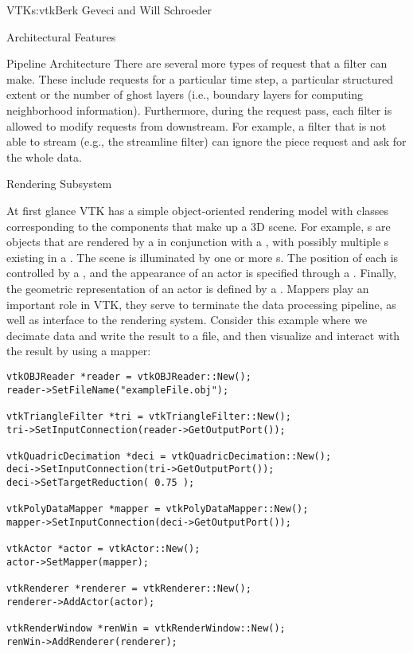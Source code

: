 \begin{aosachapter}{VTK}{s:vtk}{Berk Geveci and Will Schroeder}
\begin{aosasect1}{Architectural Features}
\begin{aosasect2}{Pipeline Architecture}
There are several more types of request that a filter can make. These
include requests for a particular time step, a particular structured
extent or the number of ghost layers (i.e., boundary layers for
computing neighborhood information). Furthermore, during the request
pass, each filter is allowed to modify requests from downstream. For
example, a filter that is not able to stream (e.g., the streamline
filter) can ignore the piece request and ask for the whole data.

\end{aosasect2}

\begin{aosasect2}{Rendering Subsystem}

At first glance VTK has a simple object-oriented rendering model with
classes corresponding to the components that make up a 3D scene. For
example, s are objects that are rendered by a
 in conjunction with a , with
possibly multiple s existing in a
. The scene is illuminated by one or more
s. The position of each  is controlled
by a , and the appearance of an actor is specified
through a . Finally, the geometric representation of
an actor is defined by a . Mappers play an important
role in VTK, they serve to terminate the data processing pipeline, as
well as interface to the rendering system. Consider this example where
we decimate data and write the result to a file, and then visualize
and interact with the result by using a mapper:

\begin{verbatim}
vtkOBJReader *reader = vtkOBJReader::New();
reader->SetFileName("exampleFile.obj");

vtkTriangleFilter *tri = vtkTriangleFilter::New();
tri->SetInputConnection(reader->GetOutputPort());

vtkQuadricDecimation *deci = vtkQuadricDecimation::New();
deci->SetInputConnection(tri->GetOutputPort());
deci->SetTargetReduction( 0.75 );

vtkPolyDataMapper *mapper = vtkPolyDataMapper::New();
mapper->SetInputConnection(deci->GetOutputPort());

vtkActor *actor = vtkActor::New();
actor->SetMapper(mapper);

vtkRenderer *renderer = vtkRenderer::New();
renderer->AddActor(actor);

vtkRenderWindow *renWin = vtkRenderWindow::New();
renWin->AddRenderer(renderer);


\end{verbatim}
\end{aosasect2}
\end{aosasect1}
\end{aosachapter}
